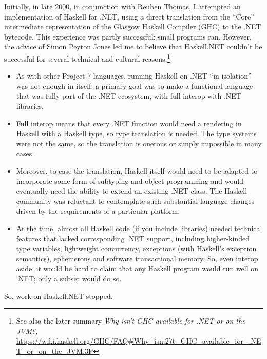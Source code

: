 \documentclass[acmsmall]{acmart}\settopmatter{}
\begin{document}
Initially, in late 2000, in conjunction with Reuben Thomas, I attempted an implementation of Haskell for .NET, using a direct translation from the “Core” intermediate
representation of the Glasgow Haskell Compiler (GHC) to the .NET bytecode. This experience was partly successful: small programs ran. However, the advice of Simon
Peyton Jones led me to believe that Haskell.NET couldn’t be successful for several technical and cultural reasons:\footnote{See also the later
summary \textit{Why isn't GHC available for .NET or on the JVM?}, \url{https://wiki.haskell.org/GHC/FAQ\#Why_isn.27t_GHC_available_for_.NET_or_on_the_JVM.3F}} 

\begin{itemize}
\item As with other Project 7 languages, running Haskell on .NET “in isolation” was not enough in itself: a primary goal was to make a functional language that
was fully part of the .NET ecosystem, with full interop with .NET libraries. 
\item Full interop means that every .NET function would need a rendering in Haskell with a Haskell type, so type translation is needed. The type systems
were not the same, so the translation is onerous or simply impossible in many cases.  
\item Moreover, to ease the translation, Haskell itself would need to be adapted to incorporate some form of subtyping and object programming and would
eventually need the ability to extend an existing .NET class.   The Haskell community was reluctant to contemplate such substantial language changes driven
by the requirements of a particular platform. 
\item At the time, almost all Haskell code (if you include libraries) needed technical features that lacked corresponding .NET support, including higher-kinded
type variables, lightweight concurrency, exceptions (with Haskell’s exception semantics), ephemerons and software transactional memory. So, even interop
aside, it would be hard to claim that any Haskell program would run well on .NET; only a subset would do so.   
\end{itemize}
So, work on Haskell.NET stopped.
\end{document}
